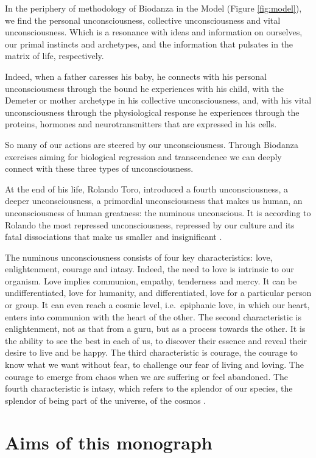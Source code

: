 \documentclass[
  11pt,
]{book}
\begin{document}
In the periphery of methodology of Biodanza in the Model (Figure \ref{fig:model}), we find the personal unconsciousness, collective unconsciousness and vital unconsciousness.
Which is a resonance with ideas and information on ourselves, our primal instincts and archetypes, and the information that pulsates in the matrix of life, respectively.

Indeed, when a father caresses his baby, he connects with his personal unconsciousness through the bound he experiences with his child, with the Demeter or mother archetype in his collective unconsciousness, and, with his vital unconsciousness through the physiological response he experiences through the proteins, hormones and neurotransmitters that are expressed in his cells.

So many of our actions are steered by our unconsciousness.
Through Biodanza exercises aiming for biological regression and transcendence we can deeply connect with these three types of unconsciousness.

At the end of his life, Rolando Toro, introduced a fourth unconsciousness, a deeper unconsciousness, a primordial unconsciousness that makes us human, an unconsciousness of human greatness: the numinous unconscious. It is according to Rolando the most repressed unconsciousness, repressed by our culture and its fatal dissociations that make us smaller and insignificant \citep{toro2009}.

The numinous unconsciousness consists of four key characteristics: love, enlightenment, courage and intasy. Indeed, the need to love is intrinsic to our organism. Love implies communion, empathy, tenderness and mercy. It can be undifferentiated, love for humanity, and differentiated, love for a particular person or group. It can even reach a cosmic level, i.e.~epiphanic love, in which our heart, enters into communion with the heart of the other. The second characteristic is enlightenment, not as that from a guru, but as a process towards the other. It is the ability to see the best in each of us, to discover their essence and reveal their desire to live and be happy. The third characteristic is courage, the courage to know what we want without fear, to challenge our fear of living and loving. The courage to emerge from chaos when we are suffering or feel abandoned. The fourth characteristic is intasy, which refers to the splendor of our species, the splendor of being part of the universe, of the cosmos \citep{toro2009}.
\newpage 

\hypertarget{aims-of-this-monograph}{%
\section{Aims of this monograph}\label{aims-of-this-monograph}}
\end{document}
